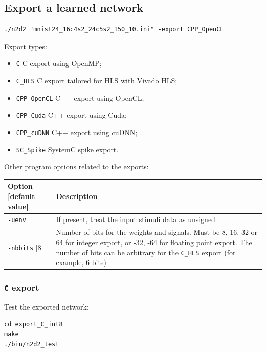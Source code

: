 \documentclass[a4paper,11pt,oneside]{article}
\newenvironment{myitemize}
{ \begin{itemize}
    \setlength{\itemsep}{0pt}
    \setlength{\parskip}{0pt}
    \setlength{\parsep}{0pt}     }
{ \end{itemize}                  }
\newcommand{\iponly}{\reversemarginpar
    \marginnote{\color{listletiblue}\normalfont\scriptsize
    {\ttfamily{}\hyperref[sec:N2D2-IP]{\color{listletiblue}N2D2 IP}} \emph{only}}}
\begin{document}
\subsection{Export a learned network}


\begin{lstlisting}
./n2d2 "mnist24_16c4s2_24c5s2_150_10.ini" -export CPP_OpenCL
\end{lstlisting}

Export types:
\begin{myitemize}
\item \lstinline!C! C export using OpenMP;
\item \lstinline!C_HLS! C export tailored for HLS with Vivado HLS;
\item \lstinline!CPP_OpenCL! C++ export using OpenCL;
\item \lstinline!CPP_Cuda! C++ export using Cuda;
\item \lstinline!CPP_cuDNN! C++ export using cuDNN;
\item \lstinline!SC_Spike! SystemC spike export.
\end{myitemize}

Other program options related to the exports:
\begin{center}
 \begin{tabular}{| p{5cm} | p{10cm} | }
 \hline
 Option [default value] & Description\\
 \hline\hline
  \lstinline!-uenv! & If present, treat the input stimuli data as unsigned \\
  \lstinline!-nbbits! [8] & Number of bits for the weights and signals.
  Must be 8, 16, 32 or 64 for integer export, or -32, -64 for floating
  point export. The number of bits can be arbitrary for the \lstinline!C_HLS!
  export (for example, 6 bits) \\
 \hline
\end{tabular}
\end{center}


\subsubsection{\texorpdfstring{%
\lstinline[basicstyle=\ttfamily\bfseries]!C! export\protect\iponly}{C export}}

Test the exported network:
\begin{lstlisting}
cd export_C_int8
make
./bin/n2d2_test
\end{lstlisting}
\end{document}
